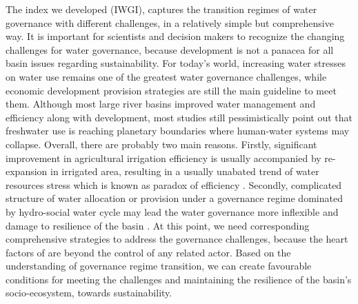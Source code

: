\documentclass[9pt, twocolumn, twoside, lineno]{pnas-new}
\begin{document}
The index we developed (IWGI), captures the transition regimes of water governance with different challenges, in a relatively simple but comprehensive way.
It is important for scientists and decision makers to recognize the changing challenges for water governance, because development is not a panacea for all basin issues regarding sustainability.
For today's world, increasing water stresses on water use remains one of the greatest water governance challenges, while economic development provision strategies are still the main guideline to meet them. 
Although most large river basins improved water management and efficiency along with development, most studies still pessimistically point out that freshwater use is reaching planetary boundaries where human-water systems may collapse.
Overall, there are probably two main reasons.
Firstly, significant improvement in agricultural irrigation efficiency is usually accompanied by re-expansion in irrigated area, resulting in a usually unabated trend of water resources stress which is known as paradox of efficiency 
\cite{graftonParadoxIrrigationEfficiency2018}. 
Secondly, complicated structure of water allocation or provision under a governance regime dominated by hydro-social water cycle may lead the water governance more inflexible and damage to resilience of the basin
\cite{qinFlexibilityIntensityGlobal2019}.
At this point, we need corresponding comprehensive strategies to address the governance challenges, because the heart factors of are beyond the control of any related actor. 
Based on the understanding of governance regime transition, we can create favourable conditions for meeting the challenges and maintaining the resilience of the basin's socio-ecosystem, towards sustainability.
\end{document}
